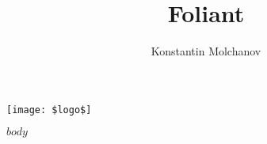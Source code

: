 \documentclass{article}
\title{Foliant}
\author{Konstantin Molchanov}
\begin{document}
    \maketitle
    \texttt{[image: \$logo\$]}
    \newpage

    $body$
\end{document}
